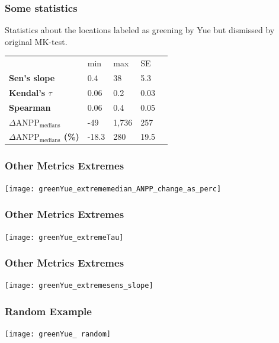 \documentclass[serif, xcolor={dvipsnames}]{beamer} %
\begin{document}
\begin{frame}
\frametitle{Some statistics}
Statistics about the locations labeled as greening by Yue but dismissed by original MK-test.
\begin{table}[!ht]
\centering
\captionsetup{singlelinecheck=false, format=hang}
\label{tab:Trendcounts}
\begin{tabular}{lllll}
\bottomrule
\rowcolor{shadecolor} 
&  min & max & SE \\ 
\rowcolor{aliceblue} 
\textbf{Sen's slope} & 0.4 & 38 & 5.3 \\
\textbf{Kendal's $\tau$}  & 0.06 & 0.2 &  0.03 \\
\rowcolor{aliceblue} 
\textbf{Spearman}  & 0.06  & 0.4 & 0.05  \\
\textbf{\scriptsize $\Delta \text{ANPP}_{\text{medians}}$} & -49 & 1,736 & 257 \\
\rowcolor{aliceblue}\textbf{\scriptsize $\Delta \text{ANPP}_{\text{medians}}$ (\%)}  & -18.3 & 280 & 19.5 \\
\toprule
\end{tabular}
\end{table}
\end{frame}
\begin{frame}
\frametitle{Other Metrics Extremes}
\begin{center}
\texttt{[image: greenYue\_extrememedian\_ANPP\_change\_as\_perc]}
\end{center}
\end{frame}
\begin{frame}
\frametitle{Other Metrics Extremes}
\begin{center}
\texttt{[image: greenYue\_extremeTau]}
\end{center}
\end{frame}

\begin{frame}
\frametitle{Other Metrics Extremes}
\begin{center}
\texttt{[image: greenYue\_extremesens\_slope]}
\end{center}
\end{frame}
\begin{frame}
\frametitle{Random Example}
\begin{center}
\texttt{[image: greenYue\_ random]}
\end{center}
\end{frame}
\end{document}
